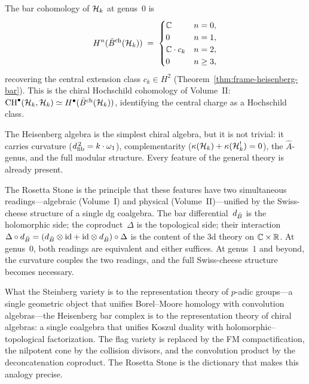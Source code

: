\begin{proposition}
\label{prop:rosetta-bar-hochschild}
The bar cohomology of $\mathcal{H}_k$ at genus~$0$ is
\begin{equation}\label{eq:rosetta-bar-cohomology}
H^n(\bar{B}^{\mathrm{ch}}(\mathcal{H}_k))
\;=\;
\begin{cases}
\mathbb{C} & n = 0, \\
0 & n = 1, \\
\mathbb{C} \cdot c_k & n = 2, \\
0 & n \geq 3,
\end{cases}
\end{equation}
recovering the central extension class $c_k \in H^2$
\textup{(}Theorem~\ref{thm:frame-heisenberg-bar}\textup{)}.
This is the chiral Hochschild cohomology of Volume~II:
$\mathrm{CH}^{\bullet}(\mathcal{H}_k, \mathcal{H}_k) \simeq
H^{\bullet}(\bar{B}^{\mathrm{ch}}(\mathcal{H}_k))$, identifying the
central charge as a Hochschild class.
\end{proposition}

\begin{remark}
\label{rem:rosetta-principle}
The Heisenberg algebra is the simplest chiral algebra, but it is
not trivial: it carries curvature ($d_{\mathrm{fib}}^{\,2} = k \cdot \omega_1$),
complementarity ($\kappa(\mathcal{H}_k) + \kappa(\mathcal{H}_k^!) = 0$),
the $\hat{A}$-genus, and the full modular structure.
Every feature of the general theory is already present.

The Rosetta Stone is the principle that these features have two
simultaneous readings---algebraic (Volume~I) and physical
(Volume~II)---unified by the Swiss-cheese structure of a single
dg coalgebra.  The bar differential~$d_{\bar{B}}$ is the
holomorphic side; the coproduct~$\Delta$ is the topological
side; their interaction
$\Delta \circ d_{\bar{B}} = (d_{\bar{B}} \otimes \mathrm{id}
+ \mathrm{id} \otimes d_{\bar{B}}) \circ \Delta$
is the content of the 3d theory on $\mathbb{C} \times \mathbb{R}$.  At genus~$0$,
both readings are equivalent and either suffices.  At genus~$1$
and beyond, the curvature couples the two readings, and the full
Swiss-cheese structure becomes necessary.

What the Steinberg variety is to the representation theory of
$p$-adic groups---a single geometric object that unifies
Borel--Moore homology with convolution algebras---the Heisenberg
bar complex is to the representation theory of chiral algebras:
a single coalgebra that unifies Koszul duality with holomorphic--topological
factorization.  The flag variety is replaced by the FM
compactification, the nilpotent cone by the collision divisors,
and the convolution product by the deconcatenation coproduct.
The Rosetta Stone is the dictionary that makes this analogy precise.
\end{remark}
